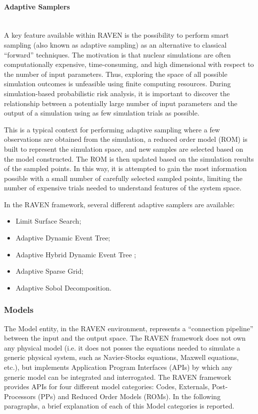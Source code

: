 \paragraph{Adaptive Samplers}~\\ 
A key feature available within RAVEN is the possibility to perform smart sampling (also known as adaptive sampling) as an alternative to classical ``forward'' techniques. The motivation is that nuclear simulations are often computationally expensive, time-consuming, and high dimensional with respect to the number of input parameters. Thus, exploring the space of all possible simulation outcomes is unfeasible using finite computing resources. During simulation-based probabilistic risk analysis, it is important to discover the relationship between a potentially large number of input parameters and the output of a simulation using as few simulation trials as possible. 

This is a typical context for performing adaptive sampling where a few observations are obtained from the simulation, a reduced order model (ROM) is built to represent the simulation space, and new samples are selected based on the model constructed. The ROM is then updated based on the simulation results of the sampled points. In this way, it is attempted to gain the most information possible with a small number of carefully selected sampled points, limiting the number of expensive trials needed to understand features of the system space.

In the RAVEN framework, several different adaptive samplers are available:
\begin{itemize}
\item Limit Surface Search;
\item Adaptive Dynamic Event Tree;
\item Adaptive Hybrid Dynamic Event Tree ;
\item Adaptive Sparse Grid;
\item Adaptive Sobol Decomposition.
\end{itemize}

\subsubsection{Models} 
The Model entity, in the RAVEN environment, represents a ``connection pipeline'' between the input and the output space. The RAVEN framework does not own any physical model (i.e. it does not posses the equations needed to simulate a generic physical system, such as Navier-Stocks equations, Maxwell equations, etc.), but implements Application Program Interfaces (APIs) by which any generic model can be integrated and interrogated. The RAVEN framework provides APIs for four different model categories: Codes, Externals, Post-Processors (PPs) and Reduced Order Models (ROMs). In the following paragraphs, a brief explanation of each of this Model categories is reported. 
